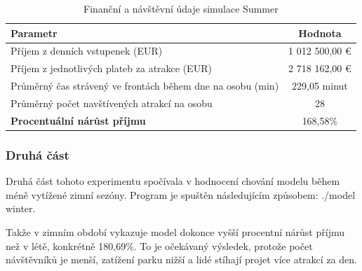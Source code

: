 \documentclass[a4paper,12pt]{article}
\begin{document}
\begin{table}[h!]
	\centering
	\caption{Finanční a návštěvní údaje simulace Summer}
	\label{tab:financial_and_visit_data}
	\begin{tabular}{|l|c|}
		\hline
		\textbf{Parametr}                                         & \textbf{Hodnota} \\ \hline
		Příjem z denních vstupenek (EUR)                          & 1 012 500,00 €   \\ \hline
		Příjem z jednotlivých plateb za atrakce (EUR)             & 2 718 162,00 €   \\ \hline
		Průměrný čas strávený ve frontách během dne na osobu (min) & 229,05 minut     \\ \hline
		Průměrný počet navštívených atrakcí na osobu             & 28               \\ \hline
		\textbf{Procentuální nárůst příjmu}                       & 168,58\%         \\ \hline
	\end{tabular}
\end{table}

\subsubsection{Druhá část}
Druhá část tohoto experimentu spočívala v hodnocení chování modelu během méně vytížené zimní sezóny. Program je spuštěn následujícím způsobem: ./model winter.

Takže v zimním období vykazuje model dokonce vyšší procentní nárůst příjmu než v létě, konkrétně 180,69\%. To je očekávaný výsledek, protože počet návštěvníků je menší, zatížení parku nižší a lidé stíhají projet více atrakcí za den.
\end{document}
